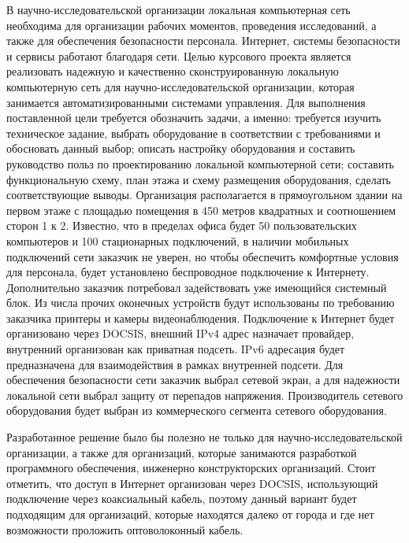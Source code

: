 \label{sec:intro}

В научно-исследовательской организации локальная компьютерная сеть необходима для организации рабочих моментов, проведения исследований, 
а также для обеспечения безопасности персонала. Интернет, системы безопасности и сервисы работают благодаря сети. Целью  курсового проекта 
является реализовать надежную и качественно сконструированную локальную компьютерную сеть для научно-исследовательской организации, 
которая занимается автоматизированными системами управления. Для выполнения поставленной цели требуется обозначить задачи, а именно: 
требуется изучить техническое задание, выбрать оборудование в соответствии с требованиями и обосновать данный выбор; описать настройку оборудования 
и составить руководство польз по проектированию локальной компьютерной сети; составить функциональную схему, план этажа и схему размещения 
оборудования, сделать соответствующие  выводы. Организация располагается в прямоугольном здании на первом этаже с площадью помещения в 450 метров 
квадратных и соотношением сторон 1 к 2. Известно, что в пределах офиса будет 50 пользовательских компьютеров и 100 стационарных подключений, 
в наличии мобильных подключений сети заказчик не уверен, но чтобы обеспечить комфортные условия для персонала, будет установлено беспроводное подключение к Интернету. 
Дополнительно заказчик потребовал задействовать уже имеющийся системный блок.
Из числа прочих оконечных устройств будут использованы по требованию заказчика принтеры и камеры видеонаблюдения.
Подключение к Интернет будет организовано через DOCSIS, внешний IPv4 адрес назначает провайдер, внутренний организован как приватная подсеть. 
IPv6 адресация будет предназначена для взаимодействия в рамках внутренней подсети. 
Для обеспечения безопасности сети заказчик выбрал сетевой экран, а для надежности локальной сети выбрал защиту от перепадов напряжения.
Производитель сетевого оборудования будет выбран из коммерческого сегмента сетевого оборудования. 


Разработанное решение было бы полезно не только для научно-исследовательской организации, а также для организаций, 
которые занимаются разработкой программного обеспечения, инженерно конструкторских организаций. Стоит отметить, что доступ в Интернет организован через
DOCSIS, использующий подключение через коаксиальный кабель, поэтому данный вариант будет подходящим для организаций, которые находятся далеко от города и 
где нет возможности проложить оптоволоконный кабель.
